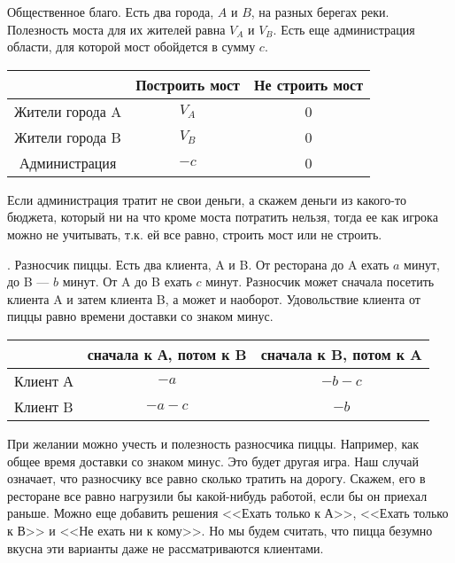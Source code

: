 \begin{myex} \label{bridge}
Общественное благо. Есть два города, $ A $ и $ B $, на разных берегах реки. Полезность моста для их жителей равна $ V_{A} $ и $ V_{B} $. Есть еще администрация области, для которой мост обойдется в сумму $ c $.


\begin{tabular}{c|cc}
& Построить мост & Не строить мост \\ 
\hline 
Жители города A & $ V_{A} $ & 0 \\ 
Жители города B & $ V_{B} $ & 0 \\ 
Администрация & $-c$ & 0 \\
\end{tabular} 

Если администрация тратит не свои деньги, а скажем деньги из какого-то бюджета, который ни на что кроме моста потратить нельзя, тогда ее как игрока можно не учитывать, т.к. ей все равно, строить мост или не строить.

\end{myex}

\begin{myex} \label{pizza}. Разносчик пиццы. Есть два клиента, A и B. От ресторана до A ехать $ a $ минут, до B --- $ b $ минут. От A до B ехать $ c $ минут. Разносчик может сначала посетить клиента A и затем клиента B, а может и наоборот. Удовольствие клиента от пиццы равно времени доставки со знаком минус. 


\begin{tabular}{c|cc}
& сначала к А, потом к B & сначала к B, потом к A \\ 
\hline 
Клиент А & $-a$ & $-b-c$ \\ 
Клиент B & $-a-c$ & $-b$ \\ 
\end{tabular} 

При желании можно учесть и полезность разносчика пиццы. Например, как общее время доставки со знаком минус. Это будет другая игра. Наш случай означает, что разносчику все равно сколько тратить на дорогу. Скажем, его в ресторане все равно нагрузили бы какой-нибудь работой, если бы он приехал раньше. Можно еще добавить решения <<Ехать только к А>>, <<Ехать только к В>> и <<Не ехать ни к кому>>. Но мы будем считать, что пицца безумно вкусна эти варианты даже не рассматриваются клиентами.

\end{myex}


